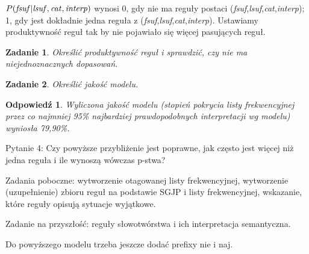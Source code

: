 \documentclass{article}
\newcommand{\cat}{{\it cat}}
\newcommand{\interp}{{\it interp}}
\newcommand{\fsuf}{{\it fsuf}}
\newcommand{\lsuf}{{\it lsuf}}
\newtheorem{task}{Zadanie}
\newtheorem{answer}{Odpowiedź}
\begin{document}

$P(\fsuf|\lsuf,\cat,\interp)$ wynosi 0, gdy nie ma reguły postaci (\fsuf,\lsuf,\cat,\interp);
1, gdy jest dokładnie jedna reguła z (\fsuf,\lsuf,\cat,\interp). Ustawiamy produktywność reguł tak 
by nie pojawiało się więcej pasujących reguł. 

\begin{task}
Określić produktywność reguł i sprawdzić, czy nie ma niejednoznacznych dopasowań.
\end{task}

\begin{task}
Określić jakość modelu.
\end{task}

\begin{answer}
Wyliczona jakość modelu (stopień pokrycia listy frekwencyjnej przez co najmniej 95\% najbardziej prawdopodobnych interpretacji wg modelu) wyniosła 79,90\%.
\end{answer}


Pytanie 4: Czy powyższe przybliżenie jest poprawne, jak często jest więcej niż jedna reguła i ile wynoszą wówczas p-stwa?

Zadania poboczne: wytworzenie otagowanej listy frekwencyjnej, wytworzenie (uzupełnienie) zbioru reguł na podstawie SGJP i listy frekwencyjnej, wskazanie, które reguły opisują sytuacje wyjątkowe.

Zadanie na przyszłość: reguły słowotwórstwa i ich interpretacja semantyczna.

Do powyższego modelu trzeba jeszcze dodać prefixy nie i naj.
\end{document}
